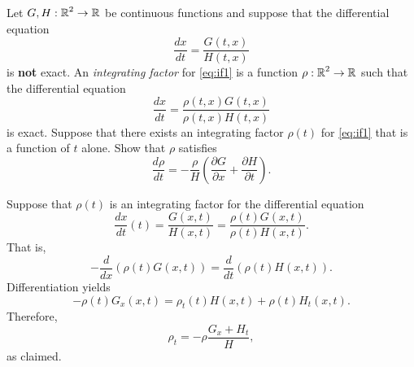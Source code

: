 \documentclass{ximera}
\begin{document}
\begin{exercise} \label{c14.6.7}
Let $G,H:\mbox{$\Bbb{R}$}^2\to\mbox{$\Bbb{R}$}$ be continuous functions and suppose that the differential 
equation 
\begin{equation}  \label{eq:if1}
\frac{dx}{dt} = \frac{G(t,x)}{H(t,x)}
\end{equation}
is {\bf not} exact.   An {\em integrating factor\/} for \eqref{eq:if1} is 
a function $\rho:\mbox{$\Bbb{R}$}^2\rightarrow\mbox{$\Bbb{R}$}$ such that the differential equation
\[
\frac{dx}{dt} = \frac{\rho(t,x) G(t,x)}{\rho(t,x)H(t,x)}
\]
is exact.  Suppose that there exists an integrating factor $\rho(t)$ for 
\eqref{eq:if1} that is a function of $t$ alone.  Show that $\rho$ satisfies
\[
\frac{d\rho}{dt} = -\frac{\rho}{H}
\left( \frac{\partial G}{\partial x}+\frac{\partial H}{\partial t}\right).
\]

\begin{solution}

Suppose that $\rho(t)$ is an integrating factor for the differential equation
\[
\frac{dx}{dt}(t) = \frac{G(x,t)}{H(x,t)}=\frac{\rho(t)G(x,t)}{\rho(t)H(x,t)}.
\]
That is,
\[
-\frac{d}{dx}(\rho(t)G(x,t)) = \frac{d}{dt}(\rho(t)H(x,t)).
\]
Differentiation yields
\[
-\rho(t)G_x(x,t) = \rho_t(t)H(x,t) + \rho(t)H_t(x,t).
\]
Therefore,
\begin{equation} \label{EX:if}
\rho_t = -\rho\frac{G_x+H_t}{H},
\end{equation}
as claimed.

\end{solution}
\end{exercise}
\end{document}
